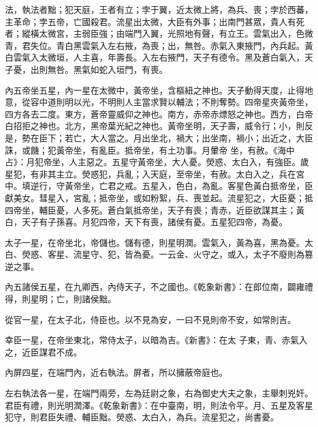\begin{pinyinscope}
 法，執法者黜；犯天庭，王者有立；孛于翼，近太微上將，為兵、喪；孛於西蕃，主革命；孛五帝，亡國殺君。流星出太微，大臣有外事；出南門甚眾，貴人有死者；縱橫太微宮，主弱臣強；由端門入翼，光照地有聲，有立王。雲氣出入，色微青，君失位。青白黑雲氣入左右掖，為喪；出，無咎。赤氣入東掖門，內兵起。黃白雲氣入太微垣，人主喜，年壽長。入左右掖門，天子有德令。黑及蒼白氣入，天子憂，出則無咎。黑氣如蛇入垣門，有喪。



 內五帝坐五星，內一星在太微中，黃帝坐，含樞紐之神也。天子動得天度，止得地意，從容中道則明以光，不明則人主當求賢以輔法；不則奪勢。四帝星夾黃帝坐，四方各去二度。東方，蒼帝靈威仰之神也。南方，赤帝赤熛怒之神也。西方，白帝白招拒之神也。北方，黑帝葉光紀之神也。黃帝坐明，天子壽，威令行；小，則反是，勢在臣下；若亡，大人當之。月出坐北，禍大；出坐南，禍小；出近之，大臣誅，或饑；犯黃帝坐，有亂臣。抵帝坐，有土功事。月暈帝
 坐，有赦。《海中占》：月犯帝坐，人主惡之。五星守黃帝坐，大人憂。熒惑、太白入，有強臣。歲星犯，有非其主立。熒惑犯，兵亂；入天庭，至帝坐，有赦。太白入之，兵在宮中。填逆行，守黃帝坐，亡君之戒。五星入，色白，為亂。客星色黃白抵帝坐，臣獻美女。彗星入，宮亂；抵帝坐，或如粉絮，兵、喪並起。流星犯之，大臣憂；抵四帝坐，輔臣憂，人多死。蒼白氣抵帝坐，天子有喪；青赤，近臣欲謀其主；黃白，天子有子孫喜。月犯四帝，天下有喪，諸侯有憂。五星犯四帝，為憂。



 太子一星，在帝坐北，帝儲也。儲有德，則星明潤。雲氣入，黃為喜，黑為憂。太白、熒惑、客星、流星守、犯，皆為憂。一云金、火守之，或入，太子不廢則為篡逆之事。



 內五諸侯五星，在九卿西，內侍天子，不之國也。《乾象新書》：在郎位南，闢雍禮得，則星明；亡，則諸侯黜。



 從官一星，在太子北，侍臣也。以不見為安，一曰不見則帝不安，如常則吉。



 幸臣一星，在帝坐東北，常侍太子，以暗為吉。《新書》：在太
 子東，青、赤氣入之，近臣謀君不成。



 內屏四星，在端門內，近右執法。屏者，所以擁蔽帝庭也。



 左右執法各一星，在端門兩旁，左為廷尉之象，右為御史大夫之象，主舉刺兇奸。君臣有禮，則光明潤澤。《乾象新書》：在中臺南，明，則法令平。月、五星及客星犯守，則君臣失禮、輔臣黜。熒惑、太白入，為兵。流星犯之，尚書憂。




\end{pinyinscope}
